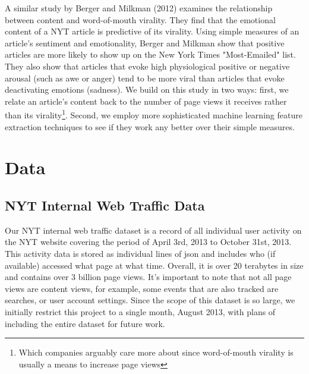 \documentclass[fleqn,12pt]{SelfArx} %
\begin{document}
A similar study by Berger and Milkman (2012) \cite{berger2012makes} examines the relationship between content and word-of-mouth virality. They find that the emotional content of a NYT article is predictive of its virality. Using simple measures of an article's sentiment and emotionality, Berger and Milkman show that positive articles are more likely to show up on the New York Times "Most-Emailed" list. They also show that articles that evoke high physiological positive or negative arousal (such as awe or anger) tend to be more viral than articles that evoke deactivating emotions (sadness). We build on this study in two ways: first, we relate an article's content back to the number of page views it receives rather than its virality\footnote{Which companies arguably care more about since word-of-mouth virality is usually a means to increase page views}. Second, we employ more sophisticated machine learning feature extraction techniques to see if they work any better over their simple measures.

\section{Data}
\subsection{NYT Internal Web Traffic Data}
Our NYT internal web traffic dataset is a record of all individual user activity on the NYT website covering the period of April 3rd, 2013 to October 31st, 2013. This activity data is stored as individual lines of json and includes who (if available) accessed what page at what time. Overall, it is over 20 terabytes in size and contains over 3 billion page views. It's important to note that not all page views are content views, for example, some events that are also tracked are searches, or user account settings. Since the scope of this dataset is so large, we initially restrict this project to a single month, August 2013, with plans of including the entire dataset for future work. 
\end{document}

